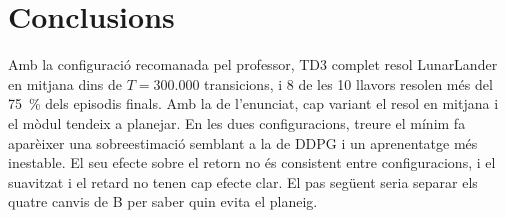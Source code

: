 \section{Conclusions}\label{sec:conclusions}

Amb la configuració recomanada pel professor, TD3 complet resol LunarLander en mitjana dins de $T = 300.000$ transicions, i 8 de les 10 llavors resolen més del 75~\% dels episodis finals. Amb la de l'enunciat, cap variant el resol en mitjana i el mòdul tendeix a planejar. En les dues configuracions, treure el mínim fa aparèixer una sobreestimació semblant a la de DDPG i un aprenentatge més inestable. El seu efecte sobre el retorn no és consistent entre configuracions, i el suavitzat i el retard no tenen cap efecte clar. El pas següent seria separar els quatre canvis de B per saber quin evita el planeig.
